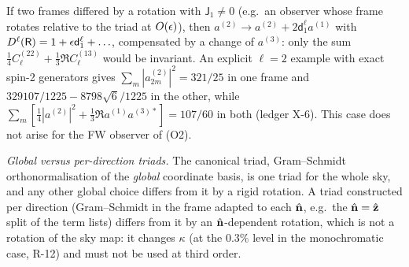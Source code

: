 \begin{remark}
If two frames differed by a rotation with $\mathsf J_1\neq0$ (e.g.\ an observer whose frame rotates relative to the triad at $O(\epsilon)$), then
$a^{(2)}\to a^{(2)}+2\mathsf d^\ell_1a^{(1)}$ with $D^\ell(\mathsf R)=1+\epsilon\mathsf d^\ell_1+\ldots$, compensated by a change of $a^{(3)}$: only the sum
$\tfrac14C^{(22)}_\ell+\tfrac13\Re C^{(13)}_\ell$ would be invariant.  An explicit $\ell=2$ example with exact spin-2 generators gives
$\sum_m|a^{(2)}_{2m}|^2=321/25$ in one frame and $329107/1225-8798\sqrt6/1225$ in the other, while $\sum_m[\tfrac14|a^{(2)}|^2+\tfrac13\Re a^{(1)}a^{(3)*}]=107/60$
in both (ledger X-6).  This case does not arise for the FW observer of (O2).
\end{remark}

\emph{Global versus per-direction triads.}  The canonical triad, Gram--Schmidt orthonormalisation of the \emph{global} coordinate basis, is one
triad for the whole sky, and any other global choice differs from it by a rigid rotation.  A triad constructed per direction (Gram--Schmidt in the
frame adapted to each $\hat{\mathbf n}$, e.g.\ the $\hat{\mathbf n}=\hat{\mathbf z}$ split of the term lists) differs from it by an $\hat{\mathbf n}$-dependent rotation, which is not a
rotation of the sky map: it changes $\kappa$ (at the $0.3\%$ level in the monochromatic case, R-12) and must not be used at third order.

